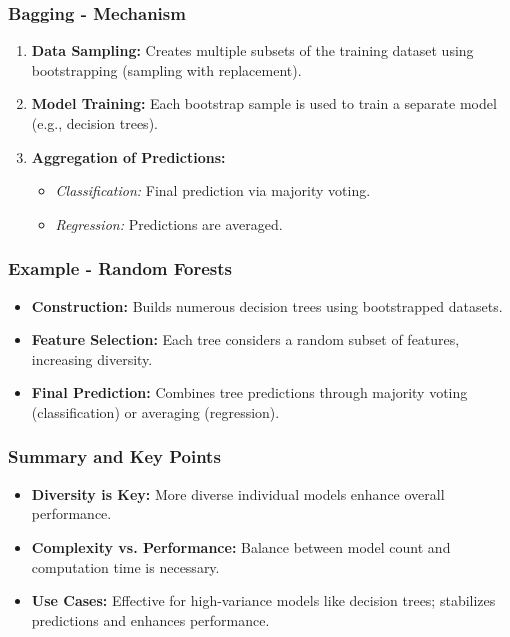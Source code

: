 \documentclass[aspectratio=169]{beamer}
\begin{document}
\begin{frame}[fragile]
    \frametitle{Bagging - Mechanism}
    \begin{enumerate}
        \item \textbf{Data Sampling:} Creates multiple subsets of the training dataset using bootstrapping (sampling with replacement).
        \item \textbf{Model Training:} Each bootstrap sample is used to train a separate model (e.g., decision trees).
        \item \textbf{Aggregation of Predictions:}
        \begin{itemize}
            \item \textit{Classification:} Final prediction via majority voting.
            \item \textit{Regression:} Predictions are averaged.
        \end{itemize}
    \end{enumerate}
\end{frame}

\begin{frame}[fragile]
    \frametitle{Example - Random Forests}
    \begin{itemize}
        \item \textbf{Construction:} Builds numerous decision trees using bootstrapped datasets.
        \item \textbf{Feature Selection:} Each tree considers a random subset of features, increasing diversity.
        \item \textbf{Final Prediction:} Combines tree predictions through majority voting (classification) or averaging (regression).
    \end{itemize}
\end{frame}

\begin{frame}[fragile]
    \frametitle{Summary and Key Points}
    \begin{itemize}
        \item \textbf{Diversity is Key:} More diverse individual models enhance overall performance.
        \item \textbf{Complexity vs. Performance:} Balance between model count and computation time is necessary.
        \item \textbf{Use Cases:} Effective for high-variance models like decision trees; stabilizes predictions and enhances performance.
    \end{itemize}
\end{frame}
\end{document}
